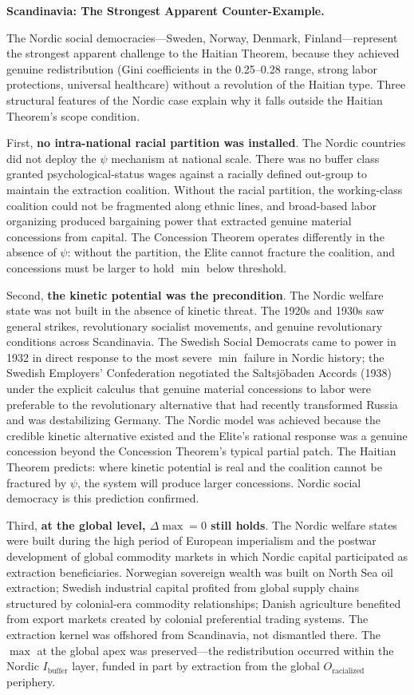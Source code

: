 \textbf{Scandinavia: The Strongest Apparent Counter-Example.}

The Nordic social democracies---Sweden, Norway, Denmark, Finland---represent the strongest apparent challenge to the Haitian Theorem, because they achieved genuine redistribution (Gini coefficients in the 0.25--0.28 range, strong labor protections, universal healthcare) without a revolution of the Haitian type. Three structural features of the Nordic case explain why it falls outside the Haitian Theorem's scope condition.

First, \textbf{no intra-national racial partition was installed}. The Nordic countries did not deploy the $\psi$ mechanism at national scale. There was no buffer class granted psychological-status wages against a racially defined out-group to maintain the extraction coalition. Without the racial partition, the working-class coalition could not be fragmented along ethnic lines, and broad-based labor organizing produced bargaining power that extracted genuine material concessions from capital. The Concession Theorem operates differently in the absence of $\psi$: without the partition, the Elite cannot fracture the coalition, and concessions must be larger to hold $\min$ below threshold.

Second, \textbf{the kinetic potential was the precondition}. The Nordic welfare state was not built in the absence of kinetic threat. The 1920s and 1930s saw general strikes, revolutionary socialist movements, and genuine revolutionary conditions across Scandinavia. The Swedish Social Democrats came to power in 1932 in direct response to the most severe $\min$ failure in Nordic history; the Swedish Employers' Confederation negotiated the Saltsjöbaden Accords (1938) under the explicit calculus that genuine material concessions to labor were preferable to the revolutionary alternative that had recently transformed Russia and was destabilizing Germany. The Nordic model was achieved because the credible kinetic alternative existed and the Elite's rational response was a genuine concession beyond the Concession Theorem's typical partial patch. The Haitian Theorem predicts: where kinetic potential is real and the coalition cannot be fractured by $\psi$, the system will produce larger concessions. Nordic social democracy is this prediction confirmed.

Third, \textbf{at the global level, $\Delta\max = 0$ still holds}. The Nordic welfare states were built during the high period of European imperialism and the postwar development of global commodity markets in which Nordic capital participated as extraction beneficiaries. Norwegian sovereign wealth was built on North Sea oil extraction; Swedish industrial capital profited from global supply chains structured by colonial-era commodity relationships; Danish agriculture benefited from export markets created by colonial preferential trading systems. The extraction kernel was offshored from Scandinavia, not dismantled there. The $\max$ at the global apex was preserved---the redistribution occurred within the Nordic $I_{\text{buffer}}$ layer, funded in part by extraction from the global $O_{\text{racialized}}$ periphery.

